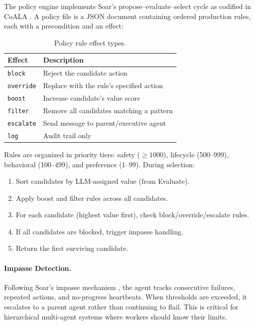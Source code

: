 \documentclass[letterpaper]{article}
\begin{document}
The policy engine implements Soar's propose--evaluate--select cycle \citep{laird2012soar} as codified in CoALA \citep{sumers2024cognitive}. A policy file is a JSON document containing ordered production rules, each with a precondition and an effect:

\begin{table}[h]
\centering
\small
\begin{tabular}{lp{5.5cm}}
\toprule
\textbf{Effect} & \textbf{Description} \\
\midrule
\texttt{block} & Reject the candidate action \\
\texttt{override} & Replace with the rule's specified action \\
\texttt{boost} & Increase candidate's value score \\
\texttt{filter} & Remove all candidates matching a pattern \\
\texttt{escalate} & Send message to parent/executive agent \\
\texttt{log} & Audit trail only \\
\bottomrule
\end{tabular}
\caption{Policy rule effect types.}
\label{tab:effects}
\end{table}

Rules are organized in priority tiers: safety ($\geq 1000$), lifecycle (500--999), behavioral (100--499), and preference (1--99). During selection:

\begin{enumerate}[leftmargin=1.5em,itemsep=2pt]
  \item Sort candidates by LLM-assigned value (from Evaluate).
  \item Apply boost and filter rules across all candidates.
  \item For each candidate (highest value first), check block/override/escalate rules.
  \item If all candidates are blocked, trigger impasse handling.
  \item Return the first surviving candidate.
\end{enumerate}

\paragraph{Impasse Detection.} Following Soar's impasse mechanism \citep{laird2012soar}, the agent tracks consecutive failures, repeated actions, and no-progress heartbeats. When thresholds are exceeded, it escalates to a parent agent rather than continuing to flail. This is critical for hierarchical multi-agent systems where workers should know their limits.
\end{document}
